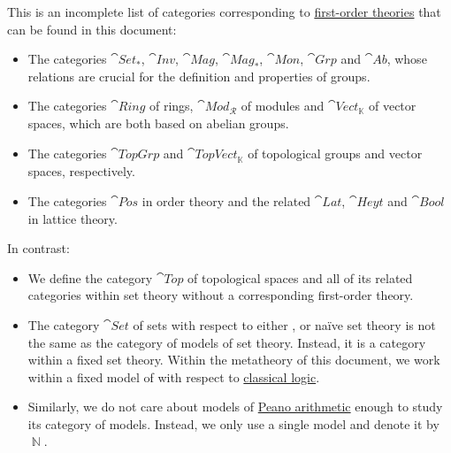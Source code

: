 \begin{example}\label{ex:def:category_of_small_first_order_models}
  This is an incomplete list of categories corresponding to \hyperref[def:first_order_theory]{first-order theories} that can be found in this document:
  \begin{itemize}
    \item The categories \hyperref[def:pointed_set/category]{\( \cat{Set}_* \)}, \hyperref[def:set_with_involution/category]{\( \cat{Inv} \)}, \hyperref[def:magma/category]{\( \cat{Mag} \)}, \hyperref[def:unital_magma/category]{\( \cat{Mag}_* \)}, \hyperref[def:unital_magma/associative]{\( \cat{Mon} \)}, \hyperref[def:group/category]{\( \cat{Grp} \)} and \hyperref[def:abelian_group]{\( \cat{Ab} \)}, whose relations are crucial for the definition and properties of groups.

    \item The categories \hyperref[def:semiring/ring]{\( \cat{Ring} \)} of rings, \hyperref[def:semiring/ring]{\( \cat{Mod}_\mscrR \)} of modules and \hyperref[def:vector_space]{\( \cat{Vect}_\BbbK \)} of vector spaces, which are both based on abelian groups.

    \item The categories \hyperref[def:category_of_topological_groups]{\( \cat{TopGrp} \)} and \hyperref[def:category_of_topological_groups]{\( \cat{TopVect}_\BbbK \)} of topological groups and vector spaces, respectively.

    \item The categories \hyperref[def:partially_ordered_set/category]{\( \cat{Pos} \)} in order theory and the related \hyperref[def:semilattice/category]{\( \cat{Lat} \)}, \hyperref[def:heyting_algebra/category]{\( \cat{Heyt} \)} and \hyperref[def:boolean_algebra/category]{\( \cat{Bool} \)} in lattice theory.
  \end{itemize}

  In contrast:
  \begin{itemize}
    \item We define the category \hyperref[def:category_of_topological_spaces]{\( \cat{Top} \)}  of topological spaces and all of its related categories within set theory without a corresponding first-order theory.

    \item The category \hyperref[def:category_of_small_sets]{\( \cat{Set} \)} of sets with respect to either ,  or na\"ive set theory is not the same as the category of models of set theory. Instead, it is a category within a fixed set theory. Within the metatheory of this document, we work within a fixed model of  with respect to \hyperref[def:classical_logic]{classical logic}.

    \item Similarly, we do not care about models of \hyperref[def:peano_arithmetic]{Peano arithmetic} enough to study its category of models. Instead, we only use a single model and denote it by \( \BbbN \).
  \end{itemize}
\end{example}

